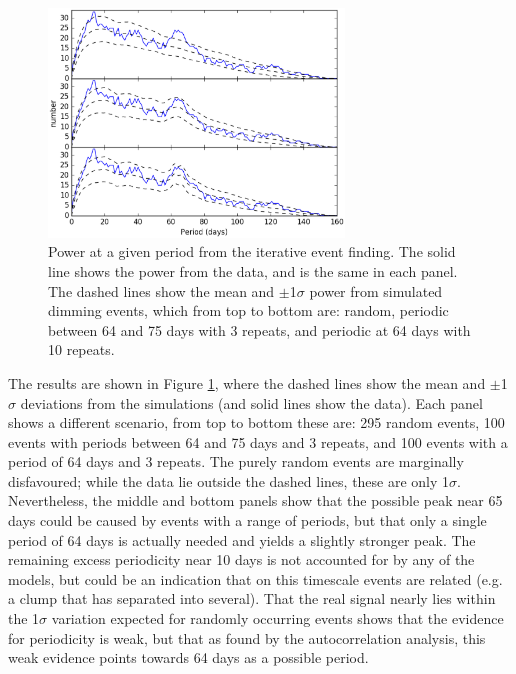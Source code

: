 \documentclass[]{rsos}
\begin{document}
\begin{figure}
  \begin{center}
    \hspace{-0.5cm} \includegraphics[width=0.7\textwidth]{figs/hist_single.ps}
    \caption{Power at a given period from the iterative event finding. The solid line
      shows the power from the data, and is the same in each panel. The dashed lines show
      the mean and $\pm$1$\sigma$ power from simulated dimming events, which from top to
      bottom are: random, periodic between 64 and 75 days with 3 repeats, and periodic at
      64 days with 10 repeats.}\label{fig:hist}
  \end{center}
\end{figure}

The results are shown in Figure \ref{fig:hist}, where the dashed lines show the mean and
$\pm$1$\sigma$ deviations from the simulations (and solid lines show the data). Each
panel shows a different scenario, from top to bottom these are: 295 random events, 100
events with periods between 64 and 75 days and 3 repeats, and 100 events with a period of
64 days and 3 repeats. The purely random events are marginally disfavoured; while the
data lie outside the dashed lines, these are only 1$\sigma$. Nevertheless, the middle and
bottom panels show that the possible peak near 65 days could be caused by events with a
range of periods, but that only a single period of 64 days is actually needed and yields
a slightly stronger peak. The remaining excess periodicity near 10 days is not accounted
for by any of the models, but could be an indication that on this timescale events are
related (e.g. a clump that has separated into several). That the real signal nearly lies
within the 1$\sigma$ variation expected for randomly occurring events shows that the
evidence for periodicity is weak, but that as found by the autocorrelation analysis, this
weak evidence points towards 64 days as a possible period.
\end{document}
